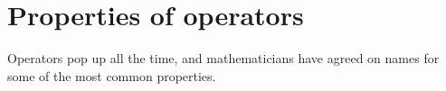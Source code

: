 \begin{fence}
\begin{code}%
\>[0]\AgdaSpace{}%
\AgdaSpace{}%
\AgdaSpace{}%
\<%
\\
\>[0]\AgdaSpace{}%
\AgdaSpace{}%
\AgdaSpace{}%
\AgdaSymbol{(}\AgdaSymbol{;}\AgdaSpace{}%
\AgdaSymbol{;}\AgdaSpace{}%
\AgdaSymbol{;}\AgdaSpace{}%
\AgdaSymbol{)}\<%
\\
\>[0]\AgdaSpace{}%
\AgdaSpace{}%
\AgdaSpace{}%
\AgdaSymbol{(}\AgdaSymbol{;}\AgdaSpace{}%
\AgdaSymbol{;}\AgdaSpace{}%
\AgdaSymbol{;}\AgdaSpace{}%
\AgdaSymbol{)}\<%
\\
\>[0]\AgdaSpace{}%
\AgdaSpace{}%
\AgdaSpace{}%
\AgdaSpace{}%
\AgdaSymbol{(}\AgdaSymbol{;}\AgdaSpace{}%
\AgdaSymbol{;}\AgdaSpace{}%
\AgdaSymbol{;}\AgdaSpace{}%
\AgdaOperator{\AgdaPrimitive{\AgdaUnderscore{}+\AgdaUnderscore{}}}\AgdaSymbol{;}\AgdaSpace{}%
\AgdaOperator{\AgdaPrimitive{\AgdaUnderscore{}*\AgdaUnderscore{}}}\AgdaSymbol{;}\AgdaSpace{}%
\AgdaSymbol{)}\<%
\end{code}
\end{fence}

\hypertarget{properties-of-operators}{%
\section{Properties of operators}\label{properties-of-operators}}

Operators pop up all the time, and mathematicians have agreed on names
for some of the most common properties.

